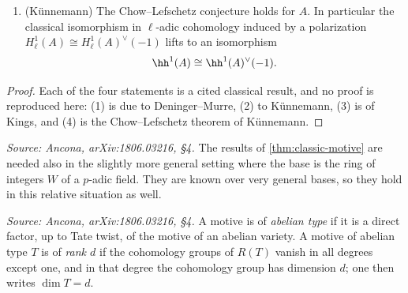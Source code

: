 \begin{theorem}
\begin{enumerate}
      naturality in (1) induces an injective morphism of algebras
      \[\End(A) \otimes_{\Z} F \hookrightarrow \End_{\CHM(k)_{F}}(\hh^1(A)),\]
      and if \(A\) is isogenous to \(B \times C\) then
      \(\hh^1(A) = \hh^1(B) \oplus \hh^1(C)\).
    \item (K\"unnemann) The Chow--Lefschetz conjecture holds for \(A\). In
      particular the classical isomorphism in \(\ell\)-adic cohomology induced by
      a polarization \(H_{\ell}^1(A) \cong H_{\ell}^1(A)^{\vee}(-1)\) lifts to an
      isomorphism
      \[\hh^1(A) \cong \hh^1(A)^{\vee}(-1).\]
  \end{enumerate}
\end{theorem}

\begin{proof}
  Each of the four statements is a cited classical result, and no proof is
  reproduced here: (1) is due to Deninger--Murre, (2) to K\"unnemann, (3) is
  \cite[Proposition 2.2.1]{Ki} of Kings, and (4) is the Chow--Lefschetz theorem
  of K\"unnemann.
\end{proof}

\begin{remark}
  \label{rem:AHP}
  \textit{Source: Ancona, arXiv:1806.03216, §4.}
  The results of \cref{thm:classic-motive} are needed also in the slightly more
  general setting where the base is the ring of integers \(W\) of a \(p\)-adic
  field. They are known over very general bases, so they hold in this relative
  situation as well.
\end{remark}

\begin{definition}
  \label{def:abelian-type-rank}
  \textit{Source: Ancona, arXiv:1806.03216, §4.}
  A motive is of \emph{abelian type} if it is a direct factor, up to Tate twist,
  of the motive of an abelian variety. A motive of abelian type \(T\) is of
  \emph{rank \(d\)} if the cohomology groups of \(R(T)\) vanish in all degrees
  except one, and in that degree the cohomology group has dimension \(d\); one
  then writes \(\dim T = d\).
\end{definition}


